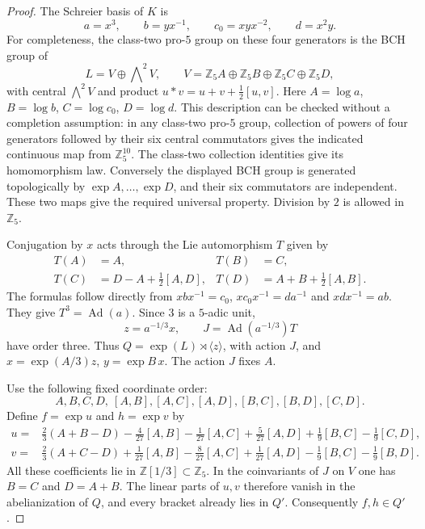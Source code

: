 \begin{proof}
The Schreier basis of $K$ is
\[
 a=x^3,\qquad b=yx^{-1},\qquad
 c_0=xyx^{-2},\qquad d=x^2y.
\]
For completeness, the class-two pro-$5$ group on these four
generators is the BCH group of
\[
 L=V\oplus\bigwedge\nolimits^2 V,\qquad
 V=\mathbb Z_5 A\oplus\mathbb Z_5 B
       \oplus\mathbb Z_5 C\oplus\mathbb Z_5 D,
\]
with central $\bigwedge^2V$ and product
$u*v=u+v+\frac12[u,v]$. Here $A=\log a$,
$B=\log b$, $C=\log c_0$, $D=\log d$.
This description can be checked without a completion
assumption: in any class-two pro-$5$ group, collection of
powers of four generators followed by their six central
commutators gives the indicated continuous map from
$\mathbb Z_5^{10}$. The class-two collection identities
give its homomorphism law. Conversely the displayed BCH
group is generated topologically by $\exp A,\ldots,\exp D$,
and their six commutators are independent. These two maps
give the required universal property. Division by $2$
is allowed in $\mathbb Z_5$.

Conjugation by $x$ acts through the Lie automorphism $T$
given by
\[
 \begin{aligned}
 T(A)&=A,&T(B)&=C,\\
 T(C)&=D-A+\tfrac12[A,D],&
 T(D)&=A+B+\tfrac12[A,B].
 \end{aligned}
\]
The formulas follow directly from
$x b x^{-1}=c_0$,
$x c_0x^{-1}=da^{-1}$ and
$x d x^{-1}=ab$. They give $T^3=\operatorname{Ad}(a)$.
Since $3$ is a $5$-adic unit,
\[
 z=a^{-1/3}x,\qquad
 J=\operatorname{Ad}(a^{-1/3})T
\]
have order three. Thus
$Q=\exp(L)\rtimes\langle z\rangle$, with action $J$,
and
$x=\exp(A/3)z$, $y=\exp B\,x$.
The action $J$ fixes $A$.

Use the following fixed coordinate order:
\[
 A,B,C,D,\ [A,B],[A,C],[A,D],[B,C],[B,D],[C,D].
\]
Define $f=\exp u$ and $h=\exp v$ by
\[
 \begin{aligned}
 u={}&\tfrac23(A+B-D)
       -\tfrac4{27}[A,B]-\tfrac1{27}[A,C]
       +\tfrac5{27}[A,D]
       +\tfrac19[B,C]-\tfrac19[C,D],\\
 v={}&\tfrac23(A+C-D)
       +\tfrac1{27}[A,B]-\tfrac8{27}[A,C]
       +\tfrac1{27}[A,D]
       -\tfrac19[B,C]-\tfrac19[B,D].
 \end{aligned}
\]
All these coefficients lie in $\mathbb Z[1/3]\subset
\mathbb Z_5$. In the coinvariants of $J$ on $V$ one has
$B=C$ and $D=A+B$. The linear parts of $u,v$ therefore
vanish in the abelianization of $Q$, and every bracket
already lies in $Q'$. Consequently $f,h\in Q'$.


\end{proof}
